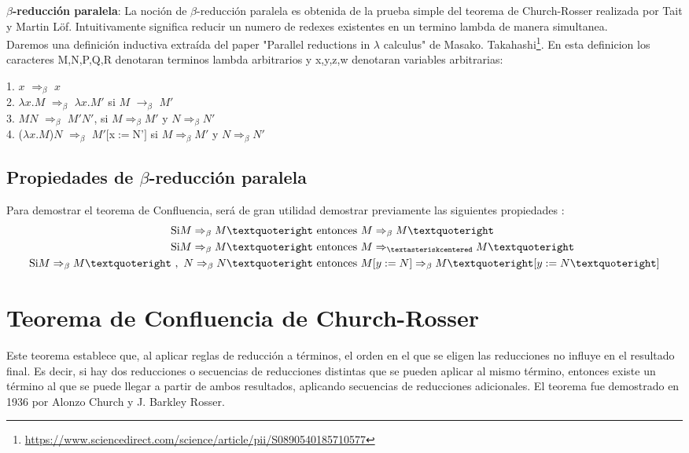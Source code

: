 \documentclass{article}
\begin{document}
\noindent\textbf{$\beta$-reducción paralela}:
La noción de $\beta$-reducción paralela es obtenida de la prueba simple del teorema de Church-Rosser realizada por Tait y Martin Löf. Intuitivamente significa reducir un numero de redexes existentes en un termino lambda de manera simultanea.\\
Daremos una definición inductiva extraída del paper "Parallel reductions in
$\lambda$ calculus" de Masako.  Takahashi\footnote{\url{https://www.sciencedirect.com/science/article/pii/S0890540185710577}}. En esta definicion los caracteres M,N,P,Q,R denotaran terminos lambda arbitrarios y x,y,z,w denotaran variables arbitrarias:

1. $x$ $\Rightarrow_{\beta}$  $x$\\

2. $\lambda x. M$  $\Rightarrow_{\beta}$ $\lambda x. M'$  si $M$ $\rightarrow_{\beta}$ $M'$\\

3. $M$$N$ $\Rightarrow_{\beta}$ $M'$$N'$, si $M$$\Rightarrow_{\beta}$$M'$ y $N$$\Rightarrow_{\beta}$$N'$ \\

4. ($\lambda x. M$)$N$ $\Rightarrow_{\beta}$ $M'[$x$ := $N'$]$ si $M$$\Rightarrow_{\beta}$$M'$ y $N$$\Rightarrow_{\beta}$$N'$ \\

\subsection{Propiedades de $\beta$-reducción paralela}
Para demostrar el teorema de Confluencia, será de gran utilidad demostrar previamente las siguientes propiedades :
\begin{align}
\text{Si}  M \Rightarrow_{\beta} M’ \ &\text{entonces}\ M \Rightarrow_{\beta} M’ \\
\text{Si} M \Rightarrow_{\beta} M’ \ &\text{entonces}\ M \Rightarrow_{\textasteriskcentered} M’ \\
\text{Si} M \Rightarrow_{\beta} M’\ ,\ N \Rightarrow_{\beta} N’ \ &\text{entonces}\  M[y:=N] \Rightarrow_{\beta} M’[y:=N’]
\end{align}



\section{Teorema de Confluencia de Church-Rosser}

Este teorema establece que, al aplicar reglas de reducción a términos, el orden en el que se eligen las reducciones no influye en el resultado final. Es decir, si hay dos reducciones o secuencias de reducciones distintas que se pueden aplicar al mismo término, entonces existe un término al que se puede llegar a partir de ambos resultados, aplicando secuencias de reducciones adicionales. El teorema fue demostrado en 1936 por Alonzo Church y J. Barkley Rosser.
\end{document}
